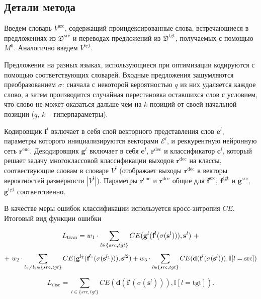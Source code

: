 \documentclass[12pt,twoside]{article}
\begin{document}
\subsection{Детали метода}   
   Введем словарь $V^{\text{src}}$, содержащий проиндексированные слова, встречающиеся в предложениях из $\mathfrak{D}^{\text{src}}$ и переводах предложений из  $\mathfrak{D}^{\text{tgt}}$, получаемых с помощью $M^0$. Аналогично введем $V^{\text{tgt}}$. 
   
   Предложения на разных языках, использующиеся при оптимизации кодируются с помощью соответствующих словарей. Входные предложения зашумляются преобразованием $\sigma$: сначала с некоторой вероятностью $q$ из них удаляется каждое слово, а затем производится случайная перестановка оставшихся слов с условием, что слово не может оказаться дальше чем на $k$ позиций от своей начальной позиции ($q$, $k$ -- гиперпараметры).
   
   Кодировщик $\textbf{f}^{l}$ включает в себя слой векторного представления слов $\textbf{e}^{l}$, параметры которого инициализируются векторами $\mathcal{E}^{l}$, и реккурентную нейронную сеть $\textbf{r}^{\text{enc}}$. Декодировщик $\textbf{g}^{l}$ включает в себя $\textbf{e}^{l}$, $\textbf{r}^{\text{dec}}$ и классификатор $\textbf{c}^{l}$, который решает задачу многоклассовой классификации выходов $\textbf{r}^{\text{dec}}$ на классы, соотвествующие словам в словаре $V^{l}$ (отображает выходы $\textbf{r}^{\text{dec}}$ в векторы вероятностей размерности $|V^{l}|$). Параметры $\textbf{r}^{\text{enc}}$ и $\textbf{r}^{\text{dec}}$ общие для $\textbf{f}^{\text{src}}$, $\textbf{f}^{\text{tgt}}$ и $\textbf{g}^{\text{src}}$, $\textbf{g}^{\text{tgt}}$ соответственно.
   
   В качестве меры ошибок классификации используется кросс-энтропия $CE$. Итоговый вид функции ошибки
   
   $$
   L_{\text{tran}} = w_1 \cdot \sum_{l \in \\ \{src, tgt\}} CE(\textbf{g}^{l}(\textbf{f}^{l}(\sigma(\mathbf{s}^{l}))), \mathbf{s}^{l})\ +
   $$
   $$
   +\ w_2 \cdot \sum_{l_1 \ne l_2 \in \\ \{src, tgt\}} CE(\textbf{g}^{l_2}(\textbf{f}^{l_1}(\sigma(\mathbf{s}^{l_1}))), \mathbf{s}^{l2}) +
   w_3 \cdot \sum_{l \in \\ \{src, tgt\}} CE(\textbf{d}(\textbf{f}^{l}(\sigma(\mathbf{s}^{l}))), \mathbb{I}[l = \text{src}])
   $$
   
   $$
   L_{\text{disc}} = \sum_{l \in \{src, tgt\}} CE(\textbf{d}(\textbf{f}^{l}(\sigma(\mathbf{s}^{l}))), \mathbb{I}[l = \text{tgt}]).
   $$
   
    







\end{document}
